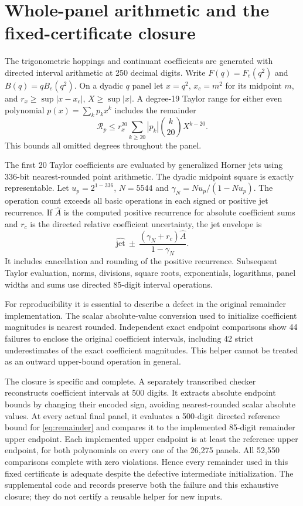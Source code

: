 \documentclass[11pt,a4paper]{article}
\begin{document}
\section{Whole-panel arithmetic and the fixed-certificate closure}
\label{app:arithmetic}

The trigonometric hoppings and continuant coefficients are generated with
directed interval arithmetic at 250 decimal digits. Write
$F(q)=F_e(q^2)$ and $B(q)=qB_e(q^2)$. On a dyadic $q$ panel let
$x=q^2$, $x_c=m^2$ for its midpoint $m$, and
$r_x\ge\sup|x-x_c|$, $X\ge\sup|x|$. A degree-19 Taylor range for either
even polynomial $p(x)=\sum_kp_kx^k$ includes the remainder
\begin{equation}
 \mathcal R_p\le r_x^{20}\sum_{k\ge20}|p_k|\binom{k}{20}X^{k-20}.
 \label{eq:remainder}
\end{equation}
This bounds all omitted degrees throughout the panel.

The first 20 Taylor coefficients are evaluated by generalized Horner jets
using 336-bit nearest-rounded point arithmetic. The dyadic midpoint square
is exactly representable. Let $u_p=2^{1-336}$,
$N=5544$ and $\gamma_N=Nu_p/(1-Nu_p)$. The operation count exceeds all
basic operations in each signed or positive jet recurrence. If
$\widehat A$ is the computed positive recurrence for absolute coefficient
sums and $r_c$ is the directed relative coefficient uncertainty, the jet
envelope is
\begin{equation}
 \widehat{\mathrm{jet}}\ \pm\
 \frac{(\gamma_N+r_c)\widehat A}{1-\gamma_N}.
\end{equation}
It includes cancellation and rounding of the positive recurrence.
Subsequent Taylor evaluation, norms, divisions, square roots, exponentials,
logarithms, panel widths and sums use directed 85-digit interval operations.

For reproducibility it is essential to describe a defect in the original
remainder implementation. The scalar absolute-value conversion used to
initialize coefficient magnitudes is nearest rounded. Independent exact
endpoint comparisons show 44 failures to enclose the original coefficient
intervals, including 42 strict underestimates of the exact coefficient
magnitudes. This helper cannot be treated as an outward upper-bound
operation in general.

The closure is specific and complete. A separately transcribed checker
reconstructs coefficient intervals at 500 digits. It extracts absolute
endpoint bounds by changing their encoded sign, avoiding nearest-rounded
scalar absolute values. At every actual final panel, it evaluates a
500-digit directed reference bound for \eqref{eq:remainder} and compares
it to the implemented 85-digit remainder upper endpoint. Each implemented
upper endpoint is at least the reference upper endpoint, for both
polynomials on every one of the 26,275 panels. All 52,550 comparisons
complete with zero violations. Hence every remainder used in this fixed
certificate is adequate despite the defective intermediate initialization.
The supplemental code and records preserve both the failure and this
exhaustive closure; they do not certify a reusable helper for new inputs.
\end{document}
